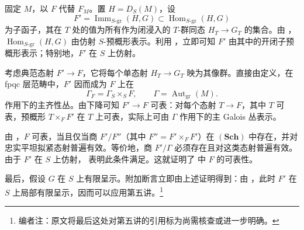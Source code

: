 固定 \(M\)，以 \(F\) 代替 \(F_M\)。置 \(H=D_S(M)\)，设 \[
  F'=\operatorname{Imm}_{S\text{-}\mathrm{gr}}(H,G)
  \subset\operatorname{Hom}_{S\text{-}\mathrm{gr}}(H,G)
\] 为子函子，其在 \(T\) 处的值为所有作为闭浸入的 \(T\)-群同态 \(H_T\to G_T\) 的集合。由 \textit{}，\(\operatorname{Hom}_{S\text{-}\mathrm{gr}}(H,G)\) 由仿射 \(S\)-预概形表示。利用 ，立即可知 \(F'\) 由其中的开闭子预概形表示；特别地，\(F'\) 在 \(S\) 上仿射。

考虑典范态射 \(F'\to F\)，它将每个单态射 \(H_T\to G_T\) 映为其像群。直接由定义，在 fpqc 层范畴中，\(F'\) 因而成为 \(F\) 上在 \[
  \Gamma_F=\Gamma_S\times_S F,
  \qquad
  \Gamma=\operatorname{Aut}_{\mathrm{gr}}(M).
\] 作用下的主齐性丛。由下降可知 \(F'\to F\) 可表：对每个态射 \(T\to F\)，其中 \(T\) 可表，预概形 \(T\times_F F'\) 在 \(T\) 上可表，实际上可由 \(\Gamma\) 作用下的主 Galois 丛表示。

由 ，\(F\) 可表，当且仅当商 \(F'/F''\)（其中 \(F''=F'\times_F F'\)）在 \((\mathbf{Sch})\) 中存在，并对忠实平坦拟紧态射普遍有效。等价地，商 \(F'/\Gamma\) 必须存在且对这类态射普遍有效。由于 \(F'\) 在 \(S\) 上仿射， 表明此条件满足。这就证明了 \textit{} 中 \(F\) 的可表性。

最后，假设 \(G\) 在 \(S\) 上有限呈示。附加断言立即由上述证明得到：由 \textit{}，此时 \(F'\) 在 \(S\) 上局部有限呈示，因而可以应用第五讲。\footnote{编者注：原文将最后这处对第五讲的引用标为尚需核查或进一步明确。}


